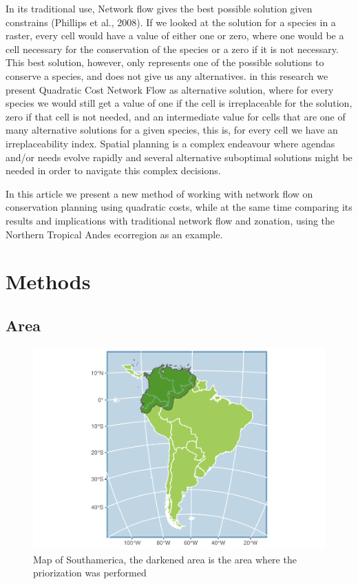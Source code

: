 \documentclass[]{article}
\begin{document}
In its traditional use, Network flow gives the best possible solution given constrains (Phillips et al., 2008). If we looked at the solution for a species in a raster, every cell would have a value of either one or zero, where one would be a cell necessary for the conservation of the species or a zero if it is not necessary. This best solution, however, only represents one of the possible solutions to conserve a species, and does not give us any alternatives. in this research we present Quadratic Cost Network Flow as alternative solution, where for every species we would still get a value of one if the cell is irreplaceable for the solution, zero if that cell is not needed, and an intermediate value for cells that are one of many alternative solutions for a given species, this is, for every cell we have an irreplaceability index. Spatial planning is a complex endeavour where agendas and/or needs evolve rapidly and several alternative suboptimal solutions might be needed in order to navigate this complex decisions.

In this article we present a new method of working with network flow on conservation planning using quadratic costs, while at the same time comparing its results and implications with traditional network flow and zonation, using the Northern Tropical Andes ecorregion as an example.

\hypertarget{methods}{%
\section{Methods}\label{methods}}

\hypertarget{area}{%
\subsection{Area}\label{area}}

\begin{figure}

{\centering \includegraphics{NFPaper_files/figure-latex/MapArea-1} 

}

\caption{Map of Southamerica, the darkened area is the area where the priorization was performed}\label{fig:MapArea}
\end{figure}
\end{document}
